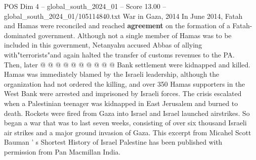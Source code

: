 \begin{textsample}{POS Dim 4 – global\_south\_2024\_01 – Score 13.00 – global\_south\_2024\_01/105114840.txt}
War in Gaza, 2014 In June 2014, Fatah and Hamas were reconciled and reached \textbf{agreement} on the formation of a Fatah-dominated government.
Although not a single member of Hamas was to be included in this government, Netanyahu accused Abbas of allying with"terrorists"and again halted the transfer of customs revenues to the PA.
Then, later @ @ @ @ @ @ @ @ @ @ Bank settlement were kidnapped and killed.
Hamas was immediately blamed by the Israeli leadership, although the organization had not ordered the killing, and over 350 Hamas supporters in the West Bank were arrested and imprisoned by Israeli forces.
The crisis escalated when a Palestinian teenager was kidnapped in East Jerusalem and burned to death.
Rockets were fired from Gaza into Israel and Israel launched airstrikes.
So began a war that was to last seven weeks, consisting of over six thousand Israeli air strikes and a major ground invasion of Gaza.
This excerpt from Micahel Scott Bauman ' s Shortest History of Israel Palestine has been published with permission from Pan Macmillan India.

\end{textsample}
